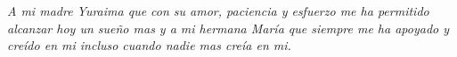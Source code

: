 \documentclass[letterpaper,titlepage,12pt,oneside,spanish,final]{report_eie}
\numberwithin{equation}{chapter}%
\numberwithin{figure}{chapter}%
\numberwithin{table}{chapter}%
\numberwithin{definition}{chapter}%
\numberwithin{lemma}{chapter}%
\numberwithin{theorem}{chapter}%
\numberwithin{corollary}{chapter}%
\numberwithin{condition}{chapter}%
\numberwithin{criterion}{chapter}%
\numberwithin{problem}{chapter}%
\numberwithin{property}{chapter}%
\numberwithin{proposition}{chapter}%
\numberwithin{solution}{chapter}%
\numberwithin{conjecture}{chapter}%
\begin{document}



\begin{figure}
        \begin{center}

        \vspace{0.5mm}
        \label{Fig.aprobacion}
        \end{center}
        \end{figure}
\thispagestyle{empty}
\newpage

\begin{figure}
        \begin{center}
        \vspace{0.5mm}
        \label{Fig.mencion}
        \end{center}
\end{figure}
\thispagestyle{empty}

\newenvironment{dedication}%
{ %
\begin{center} \em} {\end{center} \vspace*{\stretch{3}} }%
\begin{dedication}%
A mi madre Yuraima que con su amor, paciencia y esfuerzo me ha permitido alcanzar hoy un sueño mas y a mi hermana María que siempre me ha apoyado y creído en mi incluso cuando nadie mas creía en mi.
\end{dedication}%
\end{document}
